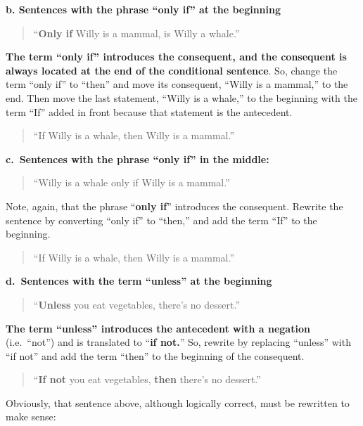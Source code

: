 \documentclass[
]{book}
\begin{document}
\textbf{b. Sentences with the phrase ``only if'' at the beginning}

\begin{quote}
``\textbf{Only if} Willy is a mammal, is Willy a whale.''
\end{quote}

\textbf{The term ``only if'' introduces the consequent, and the consequent is always located at the end of the conditional sentence}. So, change the term ``only if'' to ``then'' and move its consequent, ``Willy is a mammal,'' to the end. Then move the last statement, ``Willy is a whale,'' to the beginning with the term ``If'' added in front because that statement is the antecedent.

\begin{quote}
``If Willy is a whale, then Willy is a mammal.''
\end{quote}

\textbf{c.~Sentences with the phrase ``only if'' in the middle:}

\begin{quote}
``Willy is a whale only if Willy is a mammal.''
\end{quote}

Note, again, that the phrase ``\textbf{only if}'' introduces the consequent. Rewrite the sentence by converting ``only if'' to ``then,'' and add the term ``If'' to the beginning.

\begin{quote}
``If Willy is a whale, then Willy is a mammal.''
\end{quote}

\textbf{d.~Sentences with the term ``unless'' at the beginning}

\begin{quote}
``\textbf{Unless} you eat vegetables, there's no dessert.''
\end{quote}

\textbf{The term ``unless'' introduces the antecedent with a negation} (i.e.~``not'') and is translated to ``\textbf{if not.}'' So, rewrite by replacing ``unless'' with ``if not'' and add the term ``then'' to the beginning of the consequent.

\begin{quote}
``\textbf{If not} you eat vegetables, \textbf{then} there's no dessert.''
\end{quote}

Obviously, that sentence above, although logically correct, must be rewritten to make sense:
\end{document}

